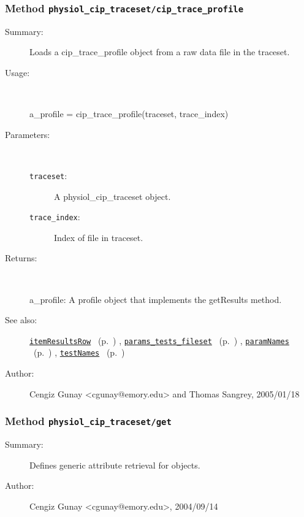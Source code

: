\subsubsection[Method \texttt{cip\_trace\_profile}]{Method \texttt{physiol\_cip\_traceset/cip\_trace\_profile}}%
%
\label{ref_physiol_cip_traceset__cip_trace_profile}%
\hypertarget{ref_physiol_cip_traceset__cip_trace_profile}{}%
\begin{description}
\item[Summary:]Loads a cip\_trace\_profile object from a raw data file in the traceset.
%
\item[Usage:]~%
\begin{lyxcode}%
a\_profile = cip\_trace\_profile(traceset, trace\_index)
%
\end{lyxcode}%
%
%
\item[Parameters:]~
\begin{description}%
\item[\texttt{traceset}:]
 A physiol\_cip\_traceset object.
\item[\texttt{trace\_index}:]
 Index of file in traceset.
\end{description}%
%
\item[Returns:
]~

	a\_profile: A profile object that implements the getResults method.
%
%
\item[See also:]%
\hyperlink{ref_itemResultsRow}{\texttt{itemResultsRow}}%
\ (p.~\pageref{ref_itemResultsRow})%
%
, \hyperlink{ref_params_tests_fileset}{\texttt{params\_tests\_fileset}}%
\ (p.~\pageref{ref_params_tests_fileset})%
%
, \hyperlink{ref_paramNames}{\texttt{paramNames}}%
\ (p.~\pageref{ref_paramNames})%
%
, \hyperlink{ref_testNames}{\texttt{testNames}}%
\ (p.~\pageref{ref_testNames})%
%
%
\item[Author:]%
Cengiz Gunay <cgunay@emory.edu> and Thomas Sangrey, 2005/01/18
%
\end{description}
\methodline%
\subsubsection[Method \texttt{get}]{Method \texttt{physiol\_cip\_traceset/get}}%
%
\label{ref_physiol_cip_traceset__get}%
\hypertarget{ref_physiol_cip_traceset__get}{}%
\begin{description}
\item[Summary:]Defines generic attribute retrieval for objects.
%
%
%
%
%
%
%
\item[Author:]%
Cengiz Gunay <cgunay@emory.edu>, 2004/09/14
%
\end{description}
\methodline%
